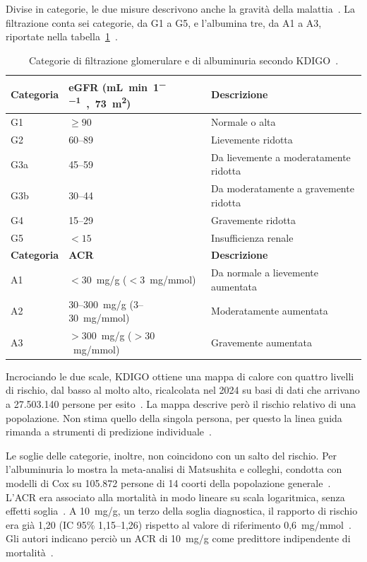 \documentclass[a4paper, 12pt, oneside]{book}
\begin{document}
Divise in categorie, le due misure descrivono anche la gravità della malattia~\cite{stevens_kdigo_2024}. La filtrazione conta sei categorie, da G1 a G5, e l'albumina tre, da A1 a A3, riportate nella tabella~\ref{tab:kdigo-categorie}~\cite{stevens_kdigo_2024}.

\begin{table}[H]
	\centering
	\caption{Categorie di filtrazione glomerulare e di albuminuria secondo KDIGO~\cite{stevens_kdigo_2024}.}
	\label{tab:kdigo-categorie}
	\begin{tabular}{|l|l|p{5.5cm}|}
		\hline
		\textbf{Categoria} & \textbf{eGFR (\si{\milli\liter\per\minute\per1,73\meter\squared})} & \textbf{Descrizione} \\ \hline
		G1 & $\geq 90$ & Normale o alta \\
		G2 & 60--89 & Lievemente ridotta \\
		G3a & 45--59 & Da lievemente a moderatamente ridotta \\
		G3b & 30--44 & Da moderatamente a gravemente ridotta \\
		G4 & 15--29 & Gravemente ridotta \\
		G5 & $< 15$ & Insufficienza renale \\ \hline
		\textbf{Categoria} & \textbf{ACR} & \textbf{Descrizione} \\ \hline
		A1 & $< 30$~mg/g ($< 3$~mg/mmol) & Da normale a lievemente aumentata \\
		A2 & 30--300~mg/g (3--30~mg/mmol) & Moderatamente aumentata \\
		A3 & $> 300$~mg/g ($> 30$~mg/mmol) & Gravemente aumentata \\ \hline
	\end{tabular}
\end{table}

\noindent Incrociando le due scale, KDIGO ottiene una mappa di calore con quattro livelli di rischio, dal basso al molto alto, ricalcolata nel 2024 su basi di dati che arrivano a 27.503.140 persone per esito~\cite{stevens_kdigo_2024}. La mappa descrive però il rischio relativo di una popolazione. Non stima quello della singola persona, per questo la linea guida rimanda a strumenti di predizione individuale~\cite{stevens_kdigo_2024}.

Le soglie delle categorie, inoltre, non coincidono con un salto del rischio. Per l'albuminuria lo mostra la meta-analisi di Matsushita e colleghi, condotta con modelli di Cox su 105.872 persone di 14 coorti della popolazione generale~\cite{matsushita_association_2010}. L'ACR era associato alla mortalità in modo lineare su scala logaritmica, senza effetti soglia~\cite{matsushita_association_2010}. A 10~mg/g, un terzo della soglia diagnostica, il rapporto di rischio era già 1,20 (IC 95\% 1,15--1,26) rispetto al valore di riferimento 0,6~mg/mmol~\cite{matsushita_association_2010}. Gli autori indicano perciò un ACR di 10~mg/g come predittore indipendente di mortalità~\cite{matsushita_association_2010}.
\end{document}
